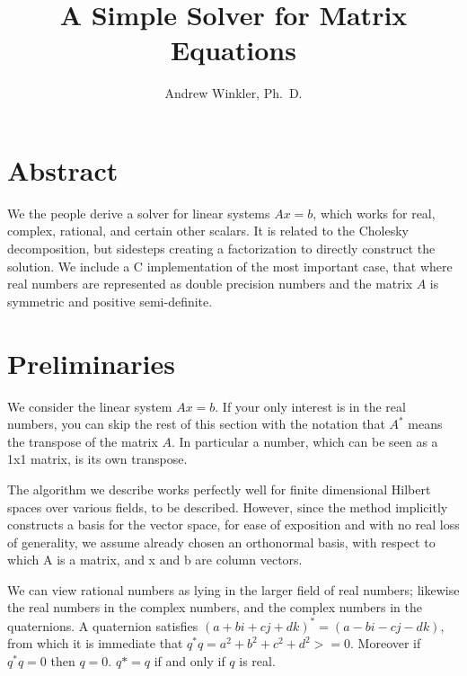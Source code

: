 \documentclass{article}
\title{A Simple Solver for Matrix Equations}
\author{Andrew Winkler, Ph.~D.}
\begin{document}
\maketitle

\section{Abstract}

We the people derive a solver for linear systems \begin{math}{}Ax=b\end{math}, which works for real, complex, rational,
and certain other scalars. It is related to the Cholesky decomposition, but sidesteps creating a factorization
to directly construct the solution. We include a C implementation of the most important case, that where
real numbers are represented as double precision numbers and the matrix \begin{math}A\end{math} is symmetric and positive semi-definite.

\section{Preliminaries}

We consider the linear system \begin{math}{}Ax=b\end{math}. If your only interest is in the real numbers,
you can skip the rest of this section with the notation that \begin{math}{}A^*\end{math} means the transpose of the matrix \begin{math}{}A\end{math}. In particular a number, which can be seen as a 1x1 matrix, is its own transpose.

The algorithm we describe works perfectly well for finite dimensional Hilbert spaces over various fields, to be described. However, since the method implicitly constructs a basis for the vector space, for ease of exposition and with no real loss of generality, we assume already chosen an orthonormal basis, with respect to which A is a matrix, and x and b are column vectors.

We can view rational numbers as lying in the larger field of real numbers; likewise the real numbers in the complex numbers, and the complex numbers in the quaternions. A quaternion satisfies \begin{math}{}(a + bi +cj + dk)^* = (a -bi -cj -dk)\end{math}, from which it is immediate that \begin{math}{}q^*q = a^2 + b^2 + c^2 + d^2 >= 0\end{math}. Moreover if \begin{math}{}q^*q =0\end{math} then \begin{math}{}q =0\end{math}.
\begin{math}{}q* = q\end{math} if and only if \begin{math}q\end{math} is real.
\end{document}
